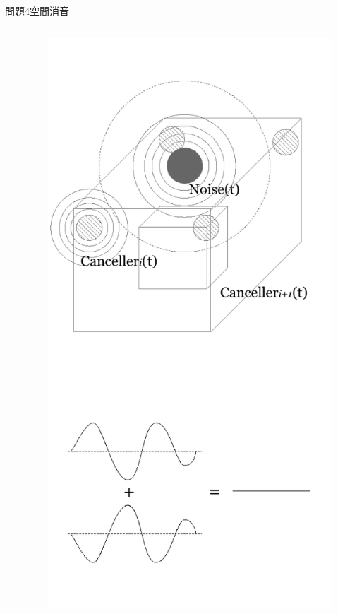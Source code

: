 \documentclass[dvipdfmx]{beamer}
\begin{document}
\begin{frame}{問題4}{空間消音}
\begin{columns}[t]
\begin{column}{0.7\textwidth}
\end{column}
\begin{column}{0.3\textwidth}
\begin{figure}[htbp]
    \centering
    \includegraphics[bb=0mm 0mm 100.0mm 170.0mm, scale=0.35, type=pdf]{img/problem4+.pdf}
\end{figure}
\end{column}
\end{columns}
\end{frame}
\end{document}
